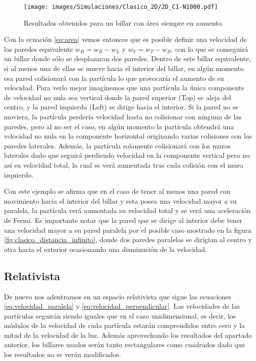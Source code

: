 \begin{figure}[H]
    \centering
    \texttt{[image: images/Simulaciones/Clasico\_2D/2D\_C1-N1000.pdf]}
    \caption{Resultados obtenidos para un billar con área siempre en aumento.}
    \label{fig:2D_C-N1000}
\end{figure}

Con la ecuación \ref{eq:area} vemos entonces que es posible definir una velocidad de las paredes equivalente \( {w_H =  w_R - w_L} \) y \( w_V = w_T - w_B \), con lo que se conseguirá un billar donde sólo se desplazaran dos paredes. Dentro de este billar equivalente, si al menos una de ellas se mueve hacia el interior del billar, en algún momento esa pared colisionará con la partícula lo que provocaría el aumento de su velocidad. Para verlo mejor imaginemos que una partícula la única componente de velocidad no nula sea vertical donde la pared superior (Top) se aleja del centro, y la pared izquierda (Left) se dirige hacia el interior. Si la pared no se moviera, la partícula perdería velocidad hasta no colisionar con ninguna de las paredes, pero al no ser el caso, en algún momento la partícula obtendrá una velocidad no nula en la componente horizontal originando varias colisiones con las paredes laterales. Además, la partícula solamente colisionará con los muros laterales dado que seguirá perdiendo velocidad en la componente vertical pero no así su velocidad total, la cual se verá aumentada tras cada colisión con el muro izquierdo.

\vspace{3mm}

Con este ejemplo se afirma que en el caso de tener al menos una pared con movimiento hacia el interior del billar y esta posea una velocidad mayor a su paralela, la partícula verá aumentada su velocidad total y se verá una aceleración de Fermi. Es importante notar que la pared que se dirige al interior debe tener una velocidad mayor a su pared paralela por el posible caso mostrado en la figura \ref{fig:clasico_distancia_infinito}, donde dos paredes paralelas se dirigían al centro y otra hacia el exterior ocasionando una disminución de la velocidad.

\subsection{Relativista}

De nuevo nos adentramos en un espacio relativista que sigue las ecuaciones \ref{eq:velocidad_paralela} y \ref{eq:velocidad_perpendicular}. Las velocidades de las partículas seguirán siendo iguales que en el caso unidimensional, es decir, los módulos de la velocidad de cada partícula estarán comprendidos entre cero y la mitad de la velocidad de la luz. Además aprovechando los resultados del apartado anterior, los billares usados serán tanto rectangulares como cuadrados dado que los resultados no se verán modificados.

